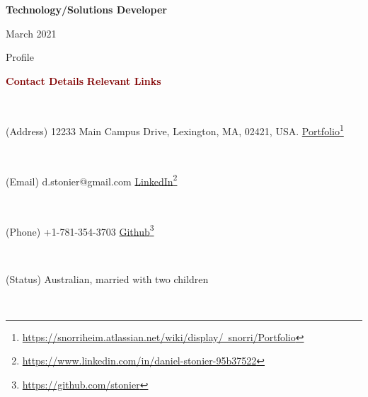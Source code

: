 \documentclass[a4paper,10pt]{article}
\begin{document}

\vspace{-2.5em}

\begin{center}
  \textbf{Technology/Solutions Developer} \\
  \begin{small} March 2021 \end{small}
\end{center}


\vspace{-2.5em}

\begin{cvsection}{Profile}

\vspace{-2em}


\rmfamily

\begin{small} \textcolor{maroon}{\textbf{Contact Details}} \hfill \textcolor{maroon}{\textbf{Relevant Links}} \end{small}  \\ 
\begin{small} (Address) 12233 Main Campus Drive, Lexington, MA, 02421, USA. \hfill \href{https://snorriheim.atlassian.net/wiki/display/~snorri/Portfolio}{Portfolio}\footnote{\href{https://snorriheim.atlassian.net/wiki/display/~snorri/Portfolio}{https://snorriheim.atlassian.net/wiki/display/~snorri/Portfolio}} \end{small} \\  
\begin{small} (Email) d.stonier@gmail.com \hfill \href{https://www.linkedin.com/in/daniel-stonier-95b37522}{LinkedIn}\footnote{\href{https://www.linkedin.com/in/daniel-stonier-95b37522}{https://www.linkedin.com/in/daniel-stonier-95b37522}} \end{small}  \\ 
\begin{small} (Phone) +1-781-354-3703  \hfill \href{https://github.com/stonier}{Github}\footnote{\href{https://github.com/stonier}{https://github.com/stonier}} \end{small} \\  
\begin{small} (Status) Australian, married with two children \end{small} \\

  \vspace{-1.5em}


\end{cvsection}
\end{document}
